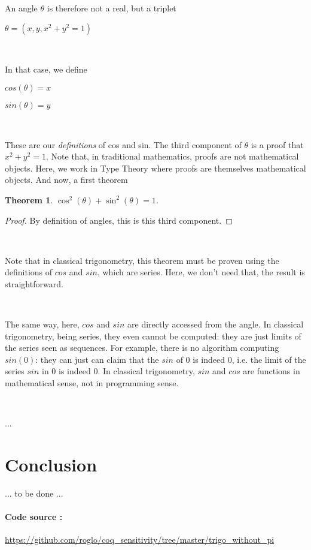 \documentclass[11pt]{article}
\newtheorem{theorem}{Theorem}
\begin{document}
\

\

\noindent An angle $\theta$ is therefore not a real, but a triplet

$\theta = (x, y, x^2\!+\!y^2\!=\!1)$

\

\noindent In that case, we define

$cos(\theta) = x$

$sin(\theta) = y$

\

\noindent These are our {\em definitions} of cos and sin. The third
component of $\theta$ is a proof that $x^2+y^2=1$. Note that, in
traditional mathematics, proofs are not mathematical objects. Here, we
work in Type Theory where proofs are themselves mathematical
objects. And now, a first theorem

\begin{theorem}
$\cos^2(\theta) + \sin^2(\theta) = 1$.
\end{theorem}

\begin{proof}
By definition of angles, this is this third component.
\end{proof}

\

\noindent Note that in classical trigonometry, this theorem must be
proven using the definitions of $cos$ and $sin$, which are
series. Here, we don't need that, the result is straightforward.

\

\noindent The same way, here, $cos$ and $sin$ are directly accessed
from the angle. In classical trigonometry, being series, they even
cannot be computed: they are just limits of the series seen as
sequences. For example, there is no algorithm computing $sin(0)$: they
can just can claim that the $sin$ of $0$ is indeed $0$, i.e. the limit
of the series $sin$ in $0$ is indeed $0$. In classical trigonometry,
$sin$ and $cos$ are functions in mathematical sense, not in
programming sense.

\

...

\section{Conclusion}

... to be done ...

\paragraph{Code source :}
\url{https://github.com/roglo/coq_sensitivity/tree/master/trigo_without_pi}
\end{document}
